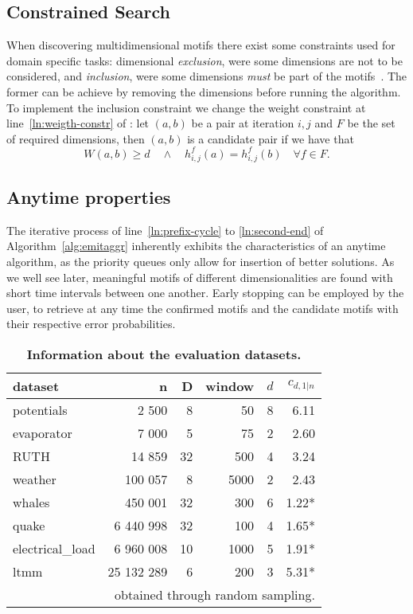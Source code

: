 \subsection{Constrained Search}
When discovering multidimensional motifs there exist some constraints used for domain specific tasks: 
dimensional \textit{exclusion}, were some dimensions are not to be considered,
and \textit{inclusion}, were some dimensions \emph{must} be part of the motifs~\cite{keoghMP}.
The former can be achieve by removing the dimensions before running the algorithm.
To implement the inclusion constraint we change the weight constraint at line~\ref{ln:weigth-constr} of :
let $(a,b)$ be a pair at iteration $i,j$ and $F$ be the set of required dimensions, then $(a,b)$ is a candidate pair if we have that 
\begin{equation*}  
W(a,b) \ge d  \quad\wedge\quad h_{i,j}^f(a)=h_{i,j}^f(b)\quad\forall f \in F.
\end{equation*}

\subsection{Anytime properties}
The iterative process of line~\ref{ln:prefix-cycle} to \ref{ln:second-end}
of Algorithm~\ref{alg:emitaggr}
inherently exhibits the characteristics of an anytime algorithm,
as the priority queues only allow for insertion of better solutions. As we well see later, meaningful motifs of different dimensionalities are found with short time intervals between one another. Early stopping can be employed by the user, to retrieve at any time the confirmed motifs and the candidate motifs with their respective error probabilities.

\begin{table}[t]
\caption{\textbf{Information about the evaluation datasets.}}
\centering
\begin{tabular}{@{}lrrrrr@{}}
\toprule
dataset          & n      & D & window & $d$ &$c_{d,1|n}$ \\ \midrule
potentials       & 2 500   & 8 &   50     &  8 & 6.11\\
evaporator       & 7 000   & 5 &   75    &   2 & 2.60\\
RUTH             & 14 859   & 32 &   500    &   4 & 3.24  \\
weather          & 100 057 & 8 &   5000     &  2 &   2.43  \\
whales           & 450 001 & 32 & 300 & 6 & 1.22*\\
quake            & 6 440 998 & 32 & 100 & 4 & 1.65* \\
electrical\_load & 6 960 008 & 10  &  1000 & 5 & 1.91*   \\ 
ltmm             & 25 132 289 & 6 & 200 & 3 & 5.31* \\
\bottomrule
\multicolumn{6}{r}{{\small * obtained through random sampling.}}
\end{tabular}
\label{tab:dataset}
\end{table}





